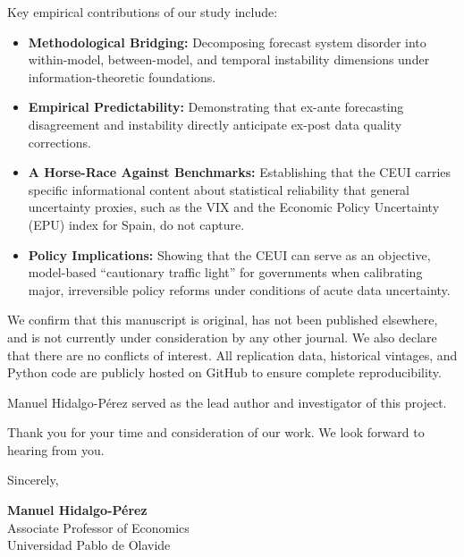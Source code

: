 \documentclass[12pt]{article}
\begin{document}
\noindent Key empirical contributions of our study include:
\begin{itemize}
    \item \textbf{Methodological Bridging:} Decomposing forecast system disorder into within-model, between-model, and temporal instability dimensions under information-theoretic foundations.
    \item \textbf{Empirical Predictability:} Demonstrating that ex-ante forecasting disagreement and instability directly anticipate ex-post data quality corrections.
    \item \textbf{A Horse-Race Against Benchmarks:} Establishing that the CEUI carries specific informational content about statistical reliability that general uncertainty proxies, such as the VIX and the Economic Policy Uncertainty (EPU) index for Spain, do not capture.
    \item \textbf{Policy Implications:} Showing that the CEUI can serve as an objective, model-based ``cautionary traffic light'' for governments when calibrating major, irreversible policy reforms under conditions of acute data uncertainty.
\end{itemize}

\noindent We confirm that this manuscript is original, has not been published elsewhere, and is not currently under consideration by any other journal. We also declare that there are no conflicts of interest. All replication data, historical vintages, and Python code are publicly hosted on GitHub to ensure complete reproducibility.

\noindent Manuel Hidalgo-Pérez served as the lead author and investigator of this project.

\noindent Thank you for your time and consideration of our work. We look forward to hearing from you.

\vspace{1.5cm}

\noindent Sincerely,

\vspace{1cm}

\noindent \textbf{Manuel Hidalgo-Pérez} \\
Associate Professor of Economics \\
Universidad Pablo de Olavide
\end{document}
